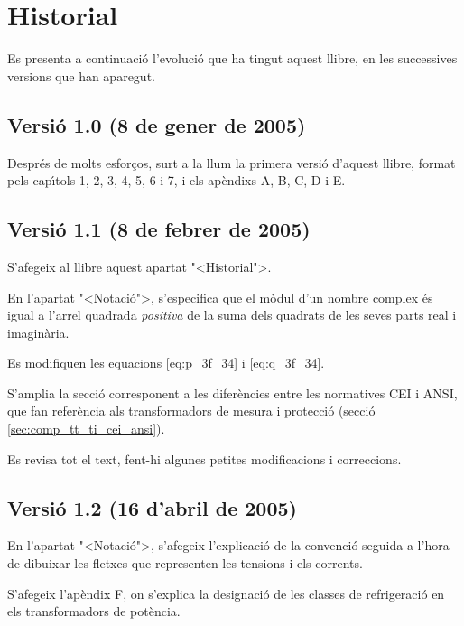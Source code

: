 \chapter*{Historial}

Es presenta a continuaci\'{o} l'evoluci\'{o} que ha tingut aquest llibre, en
les successives versions que han aparegut.

\section*{Versi\'{o} 1.0 (8 de gener de 2005)}

Despr\'{e}s de molts esfor\c{c}os, surt a la llum la primera versi\'{o} d'aquest
llibre, format pels cap\'{\i}tols 1, 2, 3, 4, 5, 6 i 7, i els ap\`{e}ndixs A,
B, C, D i E.

\section*{Versi\'{o} 1.1 (8 de febrer de 2005)}

S'afegeix al llibre aquest apartat {"<}Historial{">}.

En l'apartat {"<}Notaci\'{o}{">}, s'especifica que el m\`{o}dul d'un nombre
complex \'{e}s igual a l'arrel quadrada \emph{positiva} de la suma dels
quadrats de les seves parts real i imagin\`{a}ria.

Es modifiquen les equacions \eqref{eq:p_3f_34} i \eqref{eq:q_3f_34}.

S'amplia la secci\'{o} corresponent a les difer\`{e}ncies entre les
normatives \textsf{CEI} i \textsf{ANSI}, que fan refer\`{e}ncia als
transformadors de mesura i protecci\'{o} (secci\'{o}
\ref{sec:comp_tt_ti_cei_ansi}).

Es revisa tot el text, fent-hi algunes petites modificacions i
correccions.

\section*{Versi\'{o} 1.2 (16 d'abril de 2005)}

En l'apartat {"<}Notaci\'{o}{">}, s'afegeix l'explicaci\'{o} de la convenci\'{o}
seguida a l'hora de dibuixar les fletxes que representen les
tensions i els corrents.

S'afegeix l'ap\`{e}ndix F, on s'explica la designaci\'{o} de les classes de
refrigeraci\'{o} en els transformadors de pot\`{e}ncia.

